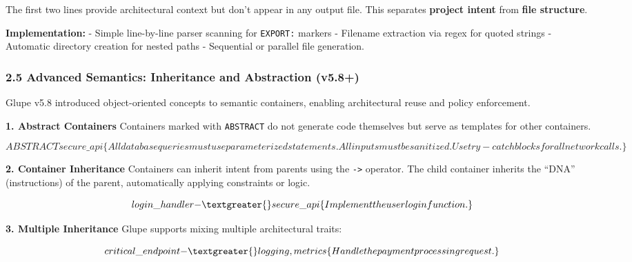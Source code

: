 \documentclass[11pt, a4paper]{article}
\newenvironment{Shaded}{\begin{snugshade}}{\end{snugshade}}
\newcommand{\NormalTok}[1]{#1}
\begin{document}
The first two lines provide architectural context but don't appear in
any output file. This separates \textbf{project intent} from
\textbf{file structure}.

\textbf{Implementation:} - Simple line-by-line parser scanning for
\texttt{EXPORT:} markers - Filename extraction via regex for quoted
strings - Automatic directory creation for nested paths - Sequential or
parallel file generation.

\subsubsection{2.5 Advanced Semantics: Inheritance and Abstraction
(v5.8+)}\label{advanced-semantics-inheritance-and-abstraction-v5.8}

Glupe v5.8 introduced object-oriented concepts to semantic containers,
enabling architectural reuse and policy enforcement.

\textbf{1. Abstract Containers} Containers marked with \texttt{ABSTRACT}
do not generate code themselves but serve as templates for other
containers.

\begin{Shaded}
\begin{Highlighting}[]
\NormalTok{$$ABSTRACT secure\_api \{}
\NormalTok{    All database queries must use parameterized statements.}
\NormalTok{    All inputs must be sanitized.}
\NormalTok{    Use try{-}catch blocks for all network calls.}
\NormalTok{\}$$}
\end{Highlighting}
\end{Shaded}

\textbf{2. Container Inheritance} Containers can inherit intent from
parents using the \texttt{-\textgreater{}} operator. The child container
inherits the ``DNA'' (instructions) of the parent, automatically
applying constraints or logic.

\begin{Shaded}
\begin{Highlighting}[]
\NormalTok{$$ login\_handler {-}\textgreater{} secure\_api \{}
\NormalTok{    Implement the user login function.}
\NormalTok{\}$$}
\end{Highlighting}
\end{Shaded}

\textbf{3. Multiple Inheritance} Glupe supports mixing multiple
architectural traits:

\begin{Shaded}
\begin{Highlighting}[]
\NormalTok{$$ critical\_endpoint {-}\textgreater{} logging, metrics \{}
\NormalTok{    Handle the payment processing request.}
\NormalTok{\}$$}
\end{Highlighting}
\end{Shaded}
\end{document}
